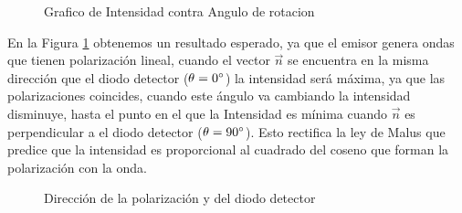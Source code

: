 \documentclass[aps,prl,reprint]{revtex4-1}
\begin{document}
\begin{figure}[H]
 \caption{Grafico de Intensidad contra Angulo de rotacion}
 \label{gmonta1.2}
\end{figure}
En la Figura \ref{gmonta1.2} obtenemos un resultado esperado, ya que el emisor genera ondas que tienen polarización lineal, cuando el vector $\vec{n}$ se encuentra en la misma dirección que el diodo detector ($\theta=0\degree$) la intensidad será máxima, ya que las polarizaciones coincides, cuando este ángulo va cambiando la intensidad disminuye, hasta el punto en el que la Intensidad es mínima cuando $\vec{n}$ es perpendicular a el diodo detector ($\theta=90\degree$). Esto rectifica la ley de Malus que predice que la intensidad es proporcional al cuadrado del coseno que forman la polarización con la onda.

\begin{figure}[H]
\begin{center}
 \caption{Dirección de la polarización y del diodo detector}
 \label{polari}
 \end{center}
\end{figure}
\end{document}
